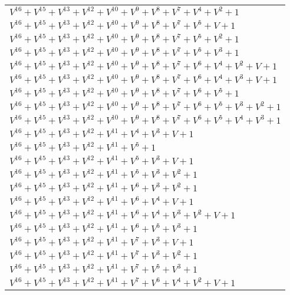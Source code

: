 \documentclass[12pt]{article}
\begin{document}
\begin{adjustwidth}{-4cm}{}
\begin{center}
\begin{longtable}{|l|}
$V^{16}  +V^{15}  +V^{13}  +V^{12}  +V^{10}  +V^{9}  +V^{8}  +V^{7}  +V^{4}  +V^{2}  + 1$ \\
$V^{16}  +V^{15}  +V^{13}  +V^{12}  +V^{10}  +V^{9}  +V^{8}  +V^{7}  +V^{5}  + V + 1$ \\
$V^{16}  +V^{15}  +V^{13}  +V^{12}  +V^{10}  +V^{9}  +V^{8}  +V^{7}  +V^{5}  +V^{2}  + 1$ \\
$V^{16}  +V^{15}  +V^{13}  +V^{12}  +V^{10}  +V^{9}  +V^{8}  +V^{7}  +V^{5}  +V^{3}  + 1$ \\
$V^{16}  +V^{15}  +V^{13}  +V^{12}  +V^{10}  +V^{9}  +V^{8}  +V^{7}  +V^{6}  +V^{4}  +V^{2}  + V + 1$ \\
$V^{16}  +V^{15}  +V^{13}  +V^{12}  +V^{10}  +V^{9}  +V^{8}  +V^{7}  +V^{6}  +V^{4}  +V^{3}  + V + 1$ \\
$V^{16}  +V^{15}  +V^{13}  +V^{12}  +V^{10}  +V^{9}  +V^{8}  +V^{7}  +V^{6}  +V^{5}  + 1$ \\
$V^{16}  +V^{15}  +V^{13}  +V^{12}  +V^{10}  +V^{9}  +V^{8}  +V^{7}  +V^{6}  +V^{5}  +V^{3}  +V^{2}  + 1$ \\
$V^{16}  +V^{15}  +V^{13}  +V^{12}  +V^{10}  +V^{9}  +V^{8}  +V^{7}  +V^{6}  +V^{5}  +V^{4}  +V^{3}  + 1$ \\
$V^{16}  +V^{15}  +V^{13}  +V^{12}  +V^{11}  +V^{4}  +V^{3}  + V + 1$ \\
$V^{16}  +V^{15}  +V^{13}  +V^{12}  +V^{11}  +V^{5}  + 1$ \\
$V^{16}  +V^{15}  +V^{13}  +V^{12}  +V^{11}  +V^{5}  +V^{3}  + V + 1$ \\
$V^{16}  +V^{15}  +V^{13}  +V^{12}  +V^{11}  +V^{5}  +V^{3}  +V^{2}  + 1$ \\
$V^{16}  +V^{15}  +V^{13}  +V^{12}  +V^{11}  +V^{6}  +V^{3}  +V^{2}  + 1$ \\
$V^{16}  +V^{15}  +V^{13}  +V^{12}  +V^{11}  +V^{6}  +V^{4}  + V + 1$ \\
$V^{16}  +V^{15}  +V^{13}  +V^{12}  +V^{11}  +V^{6}  +V^{4}  +V^{3}  +V^{2}  + V + 1$ \\
$V^{16}  +V^{15}  +V^{13}  +V^{12}  +V^{11}  +V^{6}  +V^{5}  +V^{3}  + 1$ \\
$V^{16}  +V^{15}  +V^{13}  +V^{12}  +V^{11}  +V^{7}  +V^{3}  + V + 1$ \\
$V^{16}  +V^{15}  +V^{13}  +V^{12}  +V^{11}  +V^{7}  +V^{3}  +V^{2}  + 1$ \\
$V^{16}  +V^{15}  +V^{13}  +V^{12}  +V^{11}  +V^{7}  +V^{5}  +V^{3}  + 1$ \\
$V^{16}  +V^{15}  +V^{13}  +V^{12}  +V^{11}  +V^{7}  +V^{6}  +V^{4}  +V^{2}  + V + 1$ \\

\end{longtable}
\end{center}
\end{adjustwidth}
\end{document}
